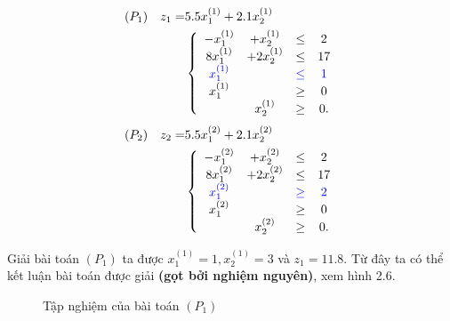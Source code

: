 \documentclass[12pt,a4paper]{report}
\begin{document}
    \begin{equation*}
        \begin{split}
            (P_1) \quad z_1= & 5.5x^{(1)}_1 + 2.1x^{(1)}_2 \\
            & \left\{\begin{array} {cccc}
            -x^{(1)}_1 &+ x^{(1)}_2 &\leq& 2 \\
            8x^{(1)}_1 &+ 2x^{(1)}_2 &\leq& 17 \\
            \color{blue} x^{(1)}_1 && \color{blue} \leq &\color{blue} 1 \\
            x^{(1)}_1 &&\geq& 0 \\
            &x^{(1)}_2 &\geq& 0. \\
            \end{array}\right. \\
        \end{split}
    \end{equation*}
   \begin{equation*}
        \begin{split}
            (P_2) \quad z_2= & 5.5x^{(2)}_1 + 2.1x^{(2)}_2  \\
            & \left\{\begin{array} {cccc}
            -x^{(2)}_1 &+ x^{(2)}_2 &\leq &2 \\
            8x^{(2)}_1 &+ 2x^{(2)}_2 &\leq &17 \\
            \color{blue} x^{(2)}_1 &&\color{blue}\geq&\color{blue} 2 \\
            x^{(2)}_1 &&\geq& 0 \\
            &x^{(2)}_2 &\geq& 0. \\
            \end{array}\right. \\
        \end{split}
    \end{equation*}

    Giải bài toán $(P_1)$ ta được $x^{(1)}_1=1, x^{(1)}_2=3$ và $z_1=11.8$. Từ đây ta có thể kết luận bài toán được giải \textbf{(gọt bởi nghiệm nguyên)}, xem hình 2.6.
    \begin{figure}
	\center
    \caption{Tập nghiệm của bài toán $(P_1)$}
    \end{figure}
\end{document}
